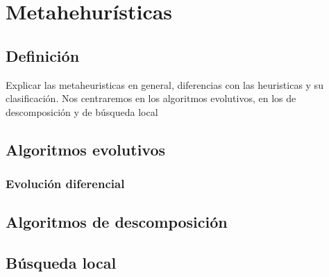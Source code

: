 
\chapter{Metahehurísticas}

\section{Definición}
Explicar las metaheuristicas en general, diferencias con las heuristicas y su clasificación. Nos centraremos en los algoritmos evolutivos, en los de descomposición y de búsqueda local

\section{Algoritmos evolutivos}

\subsection{Evolución diferencial}

\section{Algoritmos de descomposición}

\section{Búsqueda local}



\endinput
